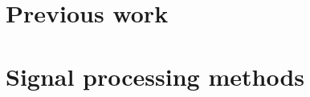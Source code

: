 \documentclass[11pt, oneside]{article}   	%
\begin{document}

\section{Previous work}

\section{Signal processing methods}
\end{document}
